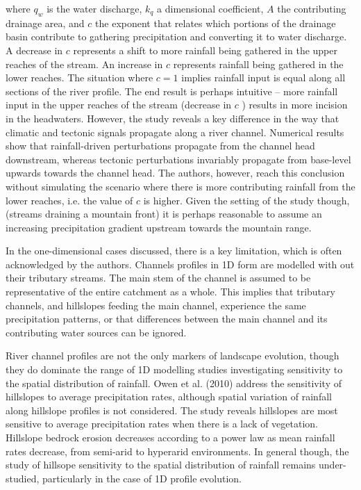 where \(q_w\) is the water discharge, \(k_q\) a dimensional coefficient, \(A\) the contributing drainage area, and \(c\) the exponent that relates which portions of the drainage basin contribute to gathering precipitation and converting it to water discharge. A decrease in \(c\) represents a shift to more rainfall being gathered in the upper reaches of the stream. An increase in \(c\) represents rainfall being gathered in the lower reaches. The situation where \(c = 1\) implies rainfall input is equal along all sections of the river profile. The end result is perhaps intuitive -- more rainfall input in the upper reaches of the stream (decrease in \(c\) ) results in more incision in the headwaters. However, the study reveals a key difference in the way that climatic and tectonic signals propagate along a river channel. Numerical results show that rainfall-driven perturbations propagate from the channel head downstream, whereas tectonic perturbations invariably propagate from base-level upwards towards the channel head. The authors, however, reach this conclusion without simulating the scenario where there is more contributing rainfall from the lower reaches, i.e. the value of \(c\) is higher. Given the setting of the study though, (streams draining a mountain front) it is perhaps reasonable to assume an increasing precipitation gradient upstream towards the mountain range.

In the one-dimensional cases discussed, there is a key limitation, which is often acknowledged by the authors. Channels profiles in 1D form are modelled with out their tributary streams. The main stem of the channel is assumed to be representative of the entire catchment as a whole. This implies that tributary channels, and hillslopes feeding the main channel, experience the same precipitation patterns, or that differences between the main channel and its contributing water sources can be ignored. 

River channel profiles are not the only markers of landscape evolution, though they do dominate the range of 1D modelling studies investigating sensitivity to the spatial distribution of rainfall. Owen et al. (2010) address the sensitivity of hillslopes to average precipitation rates, although spatial variation of rainfall along hillslope profiles is not considered. The study reveals hillslopes are most sensitive to average precipitation rates when there is a lack of vegetation. Hillslope bedrock erosion decreases according to a power law as mean rainfall rates decrease, from semi-arid to hyperarid environments. In general though, the study of hillsope sensitivity to the spatial distribution of rainfall remains under-studied, particularly in the case of 1D profile evolution.


